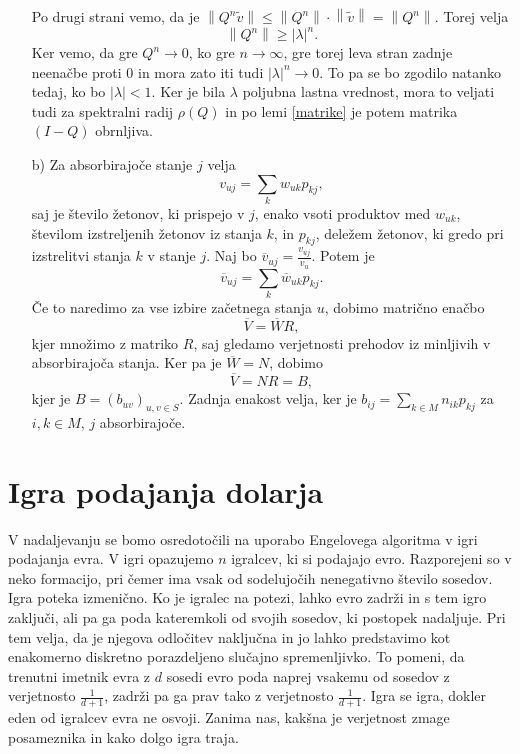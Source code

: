 \documentclass[twoside,11pt]{article}
\begin{document}
\begin{enumerate}
\[\]
Po drugi strani vemo, da je $\left\lVert Q^n\widetilde{v} \right\rVert\leq \left\lVert Q^n \right\rVert \cdot \left\lVert \widetilde{v} \right\rVert = \left\lVert Q^n \right\rVert$.
Torej velja
$$ \left\lVert Q^n \right\rVert \geq \left\lvert \lambda\right\rvert^n.$$
Ker vemo, da gre $Q^n \rightarrow 0$, ko gre $n \rightarrow \infty$, gre torej leva stran zadnje neenačbe proti 0 in mora zato iti tudi $\left\lvert \lambda \right\rvert^n \rightarrow 0$. To pa se bo zgodilo natanko tedaj, ko bo $\left\lvert \lambda \right\rvert < 1$. Ker je bila $\lambda$ poljubna lastna vrednost, mora to veljati tudi za spektralni radij $\rho(Q)$ in po lemi \ref{matrike} je potem matrika $(I-Q)$ obrnljiva.

\item[b)] Za absorbirajoče stanje $j$ velja
$$v_{uj} = \sum_{k} w_{uk}p_{kj},$$
saj je število žetonov, ki prispejo v $j$, enako vsoti produktov med $w_{uk}$, številom izstreljenih žetonov iz stanja $k$, in $p_{kj}$, deležem žetonov, ki gredo pri izstrelitvi stanja $k$ v stanje $j$. \newline
Naj bo $\overline{v}_{uj} = \frac{v_{uj}}{v_{u}}$. Potem je
$$ \overline{v}_{uj} = \sum_{k} \overline{w}_{uk}p_{kj}.$$
Če to naredimo za vse izbire začetnega stanja $u$, dobimo matrično enačbo
$$\overline{V} = \overline{W}R,$$
kjer množimo z matriko $R$, saj gledamo verjetnosti prehodov iz minljivih v absorbirajoča stanja.
Ker pa je $\overline{W} = N$, dobimo 
$$\overline{V} = NR = B, $$
kjer je $B = (b_{uv})_{u,v \in S}$. Zadnja enakost velja, ker je $b_{ij} = \sum_{k\in M} n_{ik}p_{kj}$ za $i,k \in M$, $j$ absorbirajoče.

\hfill \QED
\end{enumerate}


\section{Igra podajanja dolarja}
V nadaljevanju se bomo osredotočili na uporabo Engelovega algoritma v igri podajanja evra. V igri opazujemo $n$ 
igralcev, ki si podajajo evro. Razporejeni so v neko formacijo, pri čemer ima vsak od sodelujočih nenegativno število sosedov. Igra poteka izmenično. 
Ko je igralec na potezi, lahko evro zadrži in s tem igro zaključi, ali pa ga poda kateremkoli od svojih sosedov, ki postopek nadaljuje. Pri tem velja, da je njegova odločitev naključna in jo lahko predstavimo kot enakomerno diskretno porazdeljeno slučajno spremenljivko. To pomeni, da trenutni imetnik evra z $d$ sosedi evro poda naprej vsakemu od sosedov
z verjetnosto $\frac{1}{d+1}$, zadrži pa ga prav tako z verjetnosto $\frac{1}{d+1}$. Igra se igra, dokler eden od igralcev evra ne osvoji. Zanima nas, kakšna je verjetnost zmage posameznika in kako dolgo igra traja.
\end{document}
